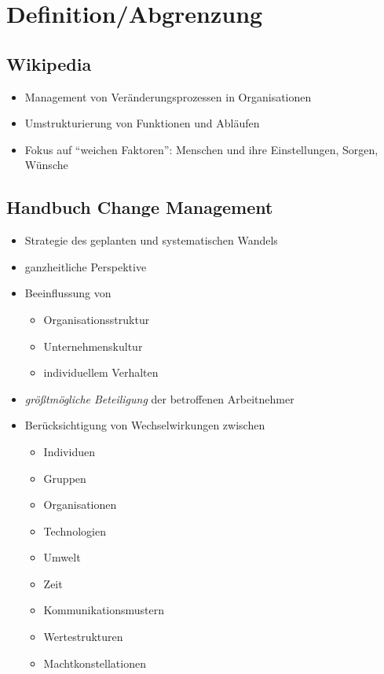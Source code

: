 \documentclass[a4paper, 12pt]{article}
\begin{document}
\tableofcontents
\pagebreak



\section{Definition/Abgrenzung}


\subsection{Wikipedia}
\begin{itemize}
  \item Management von Veränderungsprozessen in Organisationen
  \item Umstrukturierung von Funktionen und Abläufen
  \item Fokus auf ``weichen Faktoren'': Menschen und ihre Einstellungen, Sorgen, Wünsche
\end{itemize}


\subsection{Handbuch Change Management}
\begin{itemize}
  \item Strategie des geplanten und systematischen Wandels
  \item ganzheitliche Perspektive
  \item Beeinflussung von
    \begin{itemize}
      \item Organisationsstruktur
      \item Unternehmenskultur
      \item individuellem Verhalten
    \end{itemize}
  \item \emph{größtmögliche Beteiligung} der betroffenen Arbeitnehmer
  \item Berücksichtigung von Wechselwirkungen zwischen
    \begin{itemize}
      \item Individuen
      \item Gruppen
      \item Organisationen
      \item Technologien
      \item Umwelt
      \item Zeit
      \item Kommunikationsmustern
      \item Wertestrukturen
      \item Machtkonstellationen
    \end{itemize}
\end{itemize}
\end{document}
